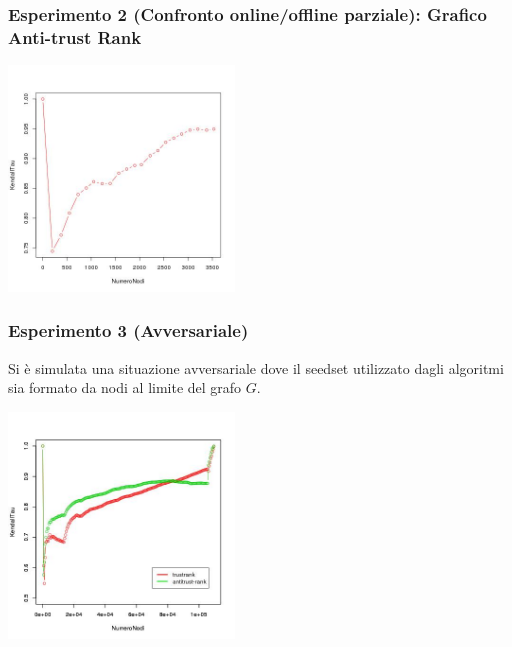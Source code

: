 \documentclass{beamer}
\begin{document}
  \begin{frame}
\frametitle{Esperimento 2 {\tiny(Confronto online/offline parziale)}: Grafico Anti-trust Rank}
\begin{center}
 \includegraphics[height=6cm]{immagini/test2/antiTrustraktGoodNodesTestMode1_62}
\end{center}
\end{frame}
\begin{frame}
 \frametitle{Esperimento 3 {\tiny(Avversariale)}}
 Si è  simulata una situazione avversariale dove il seedset  utilizzato dagli algoritmi sia formato da nodi al limite del grafo \(G\).
\begin{center}
 \includegraphics[height=6cm]{immagini/test3/coplotTrustAnti_Mode1_set3776_62}
\end{center}
\end{frame}
\end{document}
